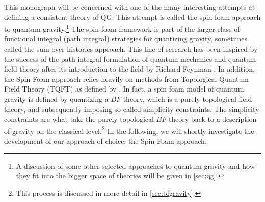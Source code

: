 This monograph will be concerned with one of the many interesting attempts at
defining a consistent theory of QG. This attempt is called the spin foam
approach to quantum gravity.\footnote{A discussion of some other selected
approaches to quantum gravity and how they fit into the bigger space of
theories will be given in \cref*{sec:qg}.} The spin foam framework is part of
the larger class of functional integral (path integral) strategies for
quantizing gravity, sometimes called the sum over histories approach. This line
of research has been inspired by the success of the path integral formulation
of quantum mechanics and quantum field theory after its introduction to the
field by Richard Feynman \cite{feynmanSpaceTimeApproachNonRelativistic1948}. In
addition, the Spin Foam approach relies heavily on methods from Topological
Quantum Field Theory (TQFT) as defined by \cite{atiyahTopologicalQuantumField1989}.
In fact, a spin foam model of quantum gravity is defined by quantizing a $BF$
theory, which is a purely topological field theory, and subsequently imposing
so-called simplicity constraints. The simplicity constraints are what take the
purely topological $BF$ theory back to a description of gravity on the classical
level.\footnote{This process is discussed in more detail in
\cref{sec:bfgravity}.} In the following, we will shortly investigate the
development of our approach of choice: the Spin Foam approach.

